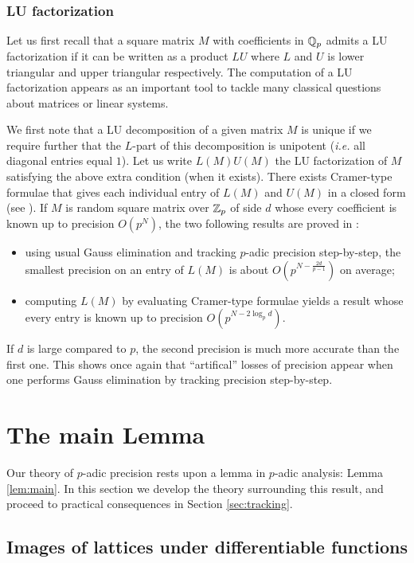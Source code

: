 \documentclass{lms}
\begin{document}
\subsubsection*{LU factorization}


Let us first recall that a square matrix $M$ with coefficients in $\mathbb Q_p$ 
admits a LU factorization if it can be written as a product $LU$ where 
$L$ and $U$ is lower triangular and upper triangular respectively. 
The computation of a LU factorization appears as an important tool to 
tackle many classical questions about matrices or linear systems.

We first note that a LU decomposition of a given matrix $M$ is unique
if we require further that the $L$-part of this decomposition is
unipotent (\emph{i.e.} all diagonal entries equal $1$). Let us write
$L(M) U(M)$ the LU factorization of $M$ satisfying the above extra
condition (when it exists). There exists Cramer-type formulae that
gives each individual entry of $L(M)$ and $U(M)$ in a closed form
(see \cite{caruso:12a}).
If $M$ is random square matrix over $\mathbb Z_p$ of side $d$ whose every
coefficient is known up to precision $O(p^N)$, the two following
results are proved in \cite{caruso:12a}:
\begin{itemize}
\item using usual Gauss elimination and tracking $p$-adic precision 
step-by-step, the smallest precision on an entry of $L(M)$ is about
$O(p^{N - \frac{2d}{p-1}})$ on average;
\item computing $L(M)$ by evaluating Cramer-type formulae yields a
result whose every entry is known up to precision $O(p^{N - 2 \log_p 
d})$.
\end{itemize}
If $d$ is large compared to $p$, the second precision is much more
accurate than the first one. This shows once again that ``artifical''
losses of precision appear when one performs Gauss elimination by
tracking precision step-by-step.

\section{The main Lemma}
\label{sec:mainlemma}

Our theory of $p$-adic precision rests upon a lemma in $p$-adic 
analysis: Lemma \ref{lem:main}.  In this section we develop the theory 
surrounding this result, and proceed to practical consequences in 
Section \ref{sec:tracking}.

\subsection{Images of lattices under differentiable functions}
\end{document}
